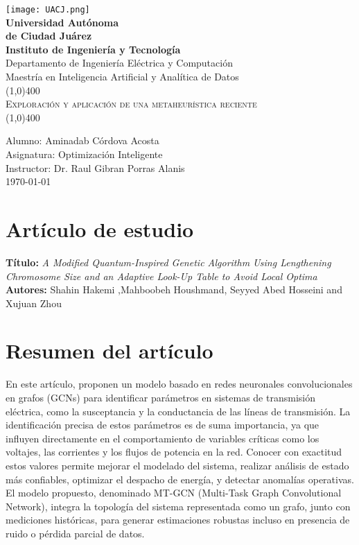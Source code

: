 \documentclass[11pt]{article}
\newcommand{\myTitle}{Exploración y aplicación de una metaheurística reciente}
\newcommand{\myName}{Alumno: Aminadab Córdova Acosta}
\newcommand{\myClass}{Asignatura: Optimización Inteligente}
\newcommand{\myTecher}{Instructor: Dr. Raul Gibran Porras Alanis}
\newcommand{\myDate}{\today}
\begin{document}
\begin{titlepage}
    \begin{center}
        \texttt{[image: UACJ.png]} \\
        \huge{\textbf{Universidad Autónoma\\de Ciudad Juárez}} \\[0.25in]
        \textbf{\Large{Instituto de Ingeniería y Tecnología}}\\
        \Large{Departamento de Ingeniería Eléctrica y Computación}\\
        \Large{Maestría en Inteligencia Artificial y Analítica de Datos}\\[1in]
        \line(1,0){400}\\[2mm]
        \textsc{\Large{\myTitle}} \\
        \line(1,0){400} \\[1in]
    \end{center}
    \begin{center}
        \myName \\
        \myClass\\
        \myTecher\\[0.5in]
        \myDate
    \end{center}
\end{titlepage}

\section{Artículo de estudio}
\textbf{Título:} \textit{A Modified Quantum-Inspired Genetic Algorithm Using Lengthening Chromosome Size and an Adaptive Look-Up Table to Avoid Local Optima} \\
\textbf{Autores:} Shahin Hakemi ,Mahboobeh Houshmand, Seyyed Abed Hosseini and Xujuan Zhou

\section{Resumen del artículo}
En este artículo, \citet{9599348} proponen un modelo basado en redes neuronales convolucionales en grafos (GCNs) para identificar parámetros en sistemas de transmisión eléctrica, como la susceptancia y la conductancia de las líneas de transmisión. La identificación precisa de estos parámetros es de suma importancia, ya que influyen directamente en el comportamiento de variables críticas como los voltajes, las corrientes y los flujos de potencia en la red. Conocer con exactitud estos valores permite mejorar el modelado del sistema, realizar análisis de estado más confiables, optimizar el despacho de energía, y detectar anomalías operativas. El modelo propuesto, denominado MT-GCN (Multi-Task Graph Convolutional Network), integra la topología del sistema representada como un grafo, junto con mediciones históricas, para generar estimaciones robustas incluso en presencia de ruido o pérdida parcial de datos.
\end{document}
